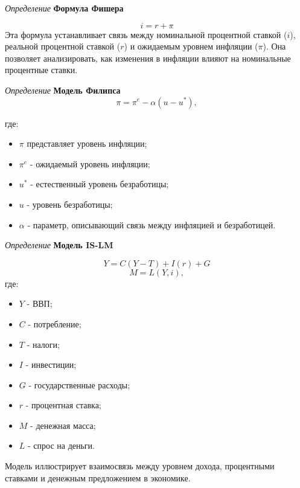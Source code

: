 \textit{Определение }\textbf{Формула Фишера}

   \[
   i = r + \pi
   \]
   Эта формула устанавливает связь между номинальной процентной ставкой (\(i\)), реальной процентной ставкой (\(r\)) и ожидаемым уровнем инфляции (\(\pi\)). Она позволяет анализировать, как изменения в инфляции влияют на номинальные процентные ставки.


\textit{Определение }\textbf{Модель Филипса}
   \[
   \pi = \pi^e - \alpha(u - u^*),
   \]

   где:
\begin{itemize}
   \item \(\pi\) представляет уровень инфляции;
   \item \(\pi^e\) - ожидаемый уровень инфляции;
   \item  \(u^*\) - естественный уровень безработицы;
   \item \(u\) - уровень безработицы;
   \item \(\alpha\) - параметр, описывающий связь между инфляцией и безработицей.
\end{itemize} 



\textit{Определение } \textbf{Модель IS-LM}



   \[
   Y = C(Y - T) + I(r) + G
   \]
   \[
   M = L(Y, i),
   \]   
где:
\begin{itemize}
   \item \(Y\) - ВВП;
   \item  \(C\) - потребление;
   \item  \(T\) - налоги;
   \item \(I\) - инвестиции;
   \item  \(G\) - государственные расходы;
   \item  \(r\) - процентная ставка;
   \item  \(M\) - денежная масса;
   \item  \(L\) - спрос на деньги.
\end{itemize}

Модель иллюстрирует взаимосвязь между уровнем дохода, процентными ставками и денежным предложением в экономике.
